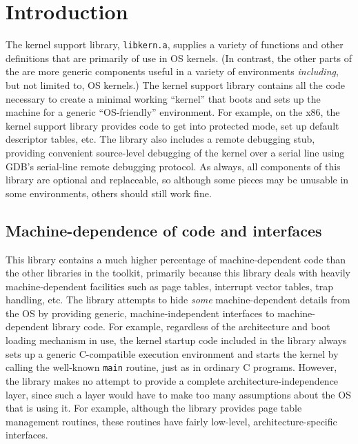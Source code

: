 %
% 
%
\label{kern}

\section{Introduction}

The kernel support library, {\tt libkern.a},
supplies a variety of functions and other definitions
that are primarily of use in OS kernels.
(In contrast, the other parts of the \oskit{}
are more generic components useful in a variety of environments
\emph{including}, but not limited to, OS kernels.)
The kernel support library contains all the code necessary
to create a minimal working ``kernel''
that boots and sets up the machine for a generic ``OS-friendly'' environment.
For example, on the x86,
the kernel support library provides code
to get into protected mode, set up default descriptor tables, etc.
The library also includes a remote debugging stub,
providing convenient source-level debugging of the kernel over a serial line
using GDB's serial-line remote debugging protocol.
As always, all components of this library are optional and replaceable,
so although some pieces may be unusable in some environments,
others should still work fine.

\subsection{Machine-dependence of code and interfaces}

This library contains a much higher percentage of machine-dependent code
than the other libraries in the toolkit,
primarily because this library deals with heavily machine-dependent facilities
such as page tables, interrupt vector tables, trap handling, etc.
The library attempts to hide \emph{some} machine-dependent details from the OS
by providing generic, machine-independent interfaces
to machine-dependent library code.
For example, regardless of the architecture and boot loading mechanism in use,
the kernel startup code included in the library
always sets up a generic C-compatible execution environment
and starts the kernel by calling the well-known {\tt main} routine,
just as in ordinary C programs.
However, the library makes no attempt to provide
a complete architecture-independence layer,
since such a layer would have to make too many assumptions
about the OS that is using it.
For example, although the library provides page table management routines,
these routines have fairly low-level, architecture-specific interfaces.

